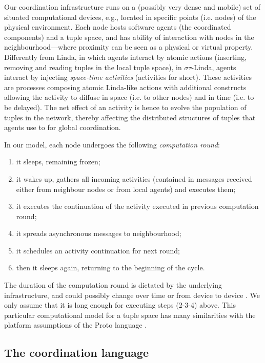 \documentclass[12pt,a4paper,twoside,openright]{book}
\begin{document}
Our coordination infrastructure runs on a (possibly very dense and mobile) set of situated computational devices, e.g., located in specific points (i.e. nodes) of the physical environment. 
%
Each node hosts software agents (the coordinated components) and a tuple space, and has ability of interaction with nodes in the neighbourhood---where proximity can be seen as a physical or virtual property.
%
Differently from Linda, in which agents interact by atomic actions (inserting, removing and reading tuples in the local tuple space), in $\sigma\tau$-Linda, agents interact by injecting \emph{space-time activities} (activities for short).
%
These activities are processes composing atomic Linda-like actions with additional constructs allowing the activity to diffuse in space (i.e. to other nodes) and in time (i.e. to be delayed).
%
The net effect of an activity is hence to evolve the population of tuples in the network, thereby affecting the distributed structures of tuples that agents use to for global coordination.

In our model, each node undergoes the following \emph{computation round}:
\begin{enumerate}
 \item it sleeps, remaining frozen;
 \item it wakes up, gathers all incoming activities (contained in messages received either from neighbour nodes or from local agents) and executes them;
 \item it executes the continuation of the activity executed in previous computation round;
 \item it spreads asynchronous messages to neighbourhood;
 \item it schedules an activity continuation for next round;
 \item then it sleeps again, returning to the beginning of the cycle.
\end{enumerate}
%
The duration of the computation round is dictated by the underlying infrastructure, and could possibly change over time or from device to device \cite{ProtoTime}.
%
We only assume that it is long enough for executing steps (2-3-4) above.
%
This particular computational model for a tuple space has many similarities with the platform assumptions of the Proto language \cite{proto,spatialcomputing-sac11,spatialcomputing-scp78}.

\subsection{The coordination language}
\end{document}
